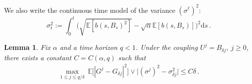 \documentclass[11pt]{article}
\newtheorem{lemma}[theorem]{Lemma}
\theoremstyle{definition}
\theoremstyle{remark}
\numberwithin{equation}{section}
\numberwithin{theorem}{section}
\newcommand{\E}{\mathbb E}
\newcommand{\rmd}{\mathrm{d}}
\begin{document}
 We also write the continuous time model of the variance $(\sigma^\ell)^2 $:
%  
\begin{equation}\label{eq:continuous_variance}
\sigma_t^2 := \int_{0}^{t}\Big(\sqrt{\E[b(s,B_s)^2]} - \sqrt{\alpha} \E[b(s,B_s)]\Big)^2 \rmd s\,.
\end{equation}


\begin{lemma}
\label{lem:time_discretization}
Fix $\alpha$ and a time horizon $q<1$. Under the coupling $U^{j} = B_{\delta j}$, $j \ge 0$, there exists a constant $C = C(\alpha,q)$ such that  
\begin{align}
\max_{1 \le j \le q/\delta} ~\E\big[ | G^j - G_{\delta j}|^2\big]   
\vee \big| (\sigma^j)^2  - \sigma_{\delta j}^2 \big| \le C\delta\,.\label{eq:discretize_diff_small}
\end{align}
\end{lemma}
\end{document}
